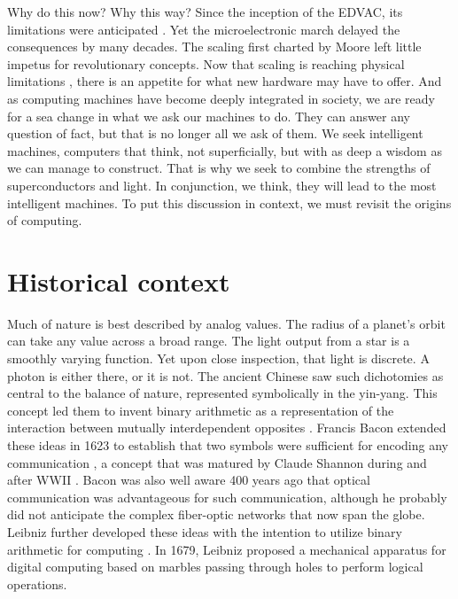 \documentclass[twocolumn]{article}
\begin{document}
Why do this now? Why this way? Since the inception of the EDVAC, its limitations were anticipated \cite{}. Yet the microelectronic march delayed the consequences by many decades. The scaling first charted by Moore \cite{} left little impetus for revolutionary concepts. Now that scaling is reaching physical limitations \cite{}, there is an appetite for what new hardware may have to offer. And as computing machines have become deeply integrated in society, we are ready for a sea change in what we ask our machines to do. They can answer any question of fact, but that is no longer all we ask of them. We seek intelligent machines, computers that think, not superficially, but with as deep a wisdom as we can manage to construct. That is why we seek to combine the strengths of superconductors and light. In conjunction, we think, they will lead to the most intelligent machines. To put this discussion in context, we must revisit the origins of computing.

\section{\label{sec:history}Historical context}
Much of nature is best described by analog values. The radius of a planet's orbit can take any value across a broad range. The light output from a star is a smoothly varying function. Yet upon close inspection, that light is discrete. A photon is either there, or it is not. The ancient Chinese saw such dichotomies as central to the balance of nature, represented symbolically in the yin-yang. This concept led them to invent binary arithmetic as a representation of the interaction between mutually interdependent opposites \cite{http://www.atimes.com/leibniz-chinese-invented-first-binary-code/}. Francis Bacon extended these ideas in 1623 to establish that two symbols were sufficient for encoding any communication \cite{dy2012}, a concept that was matured by Claude Shannon during and after WWII \cite{sh1948}. Bacon was also well aware 400 years ago that optical communication was advantageous for such communication, although he probably did not anticipate the complex fiber-optic networks that now span the globe. Leibniz further developed these ideas \cite{http://www.leibniz-translations.com/binary.htm} with the intention to utilize binary arithmetic for computing \cite{https://hal.archives-ouvertes.fr/ads-00104781/document,dy2012}. In 1679, Leibniz proposed a mechanical apparatus for digital computing based on marbles passing through holes to perform logical operations. 
\end{document}
